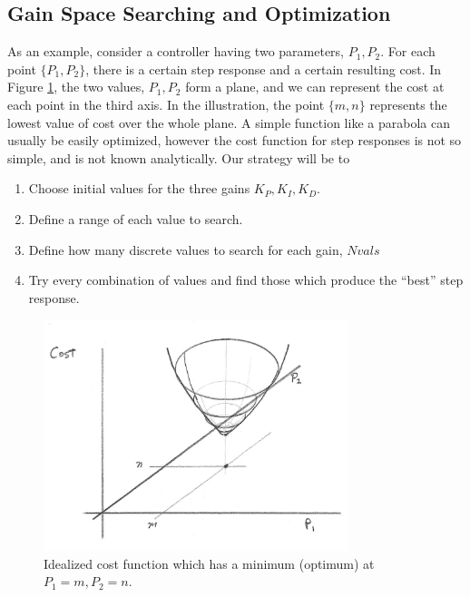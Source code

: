 \subsection{Gain Space Searching and Optimization}\label{searchrange}


As an example, consider a controller having two parameters, $P_1, P_2$.  For each point $\{P_1 , P_2 \}$, there is a certain step response and a certain resulting cost.  In Figure \ref{CostFunc}, the two values, $P_1, P_2$ form a plane, and we can represent the cost at each point in the third axis.   In the illustration, the point $\{m,n\}$ represents the lowest value of cost over the whole plane.  A simple function like a parabola can usually be easily optimized, however the cost function for step responses is not so simple, and is not known analytically.
Our strategy will be to
\begin{enumerate}
  \item Choose initial values for the three gains $K_P, K_I, K_D$.
  \item Define a range of each value to search.
  \item Define how many discrete values to search for each gain, $Nvals$
  \item Try every combination of values and find those which produce the ``best'' step response.
\end{enumerate}



\begin{figure}\centering
\includegraphics[width = 3.5in]{figs09/00648.png}
\caption{Idealized cost function which has a minimum (optimum) at $P_1=m, P_2=n$.}\label{CostFunc}
\end{figure}





